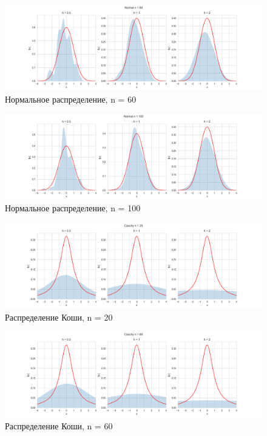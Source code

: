 \documentclass[../main.tex]{subfiles}
\begin{document}
    \begin{figure}[H]
        \centering
        \includegraphics[scale=0.5]{figures/NormalNuclear60.png}
        \caption{Нормальное распределение, n = 60}
        \label{fig:normal}
    \end{figure}
    
    \begin{figure}[H]
        \centering
        \includegraphics[scale=0.5]{figures/NormalNuclear100.png}
        \caption{Нормальное распределение, n = 100}
        \label{fig:normal}
    \end{figure}
    
    \begin{figure}[H]
        \centering
        \includegraphics[scale=0.5]{figures/CauchyNuclear20.png}
        \caption{Распределение Коши, n = 20}
        \label{fig:normal}
    \end{figure}
    
    \begin{figure}[H]
        \centering
        \includegraphics[scale=0.5]{figures/CauchyNuclear60.png}
        \caption{Распределение Коши, n = 60}
        \label{fig:normal}
    \end{figure}
    
\end{document}
